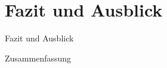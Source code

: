 \documentclass[dvipsnames]{beamer} %
\begin{document}
	\section{Fazit und Ausblick}
	\begin{frame}{Fazit und Ausblick}
	\end{frame}

	\begin{frame}{Zusammenfassung}
		\tableofcontents
	\end{frame}
\end{document}
